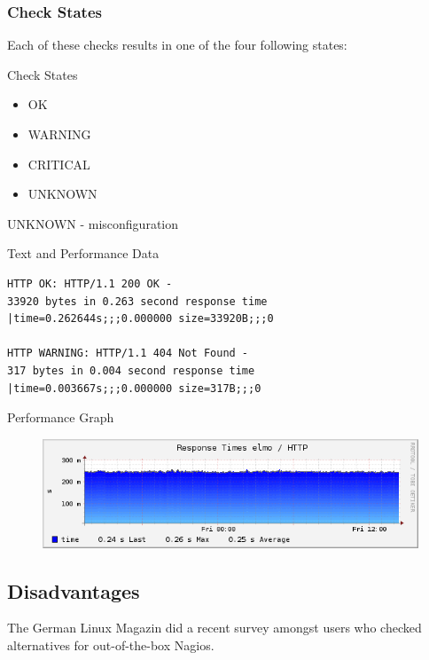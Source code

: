 \subsubsection{Check States}

Each of these checks results in one of the four
following states:

\begin{frame}[fragile]{Check States}

\begin{itemize}
\item OK
\item WARNING 
\item CRITICAL
\item UNKNOWN
\end{itemize}
\end{frame}

UNKNOWN - misconfiguration

\begin{frame}[fragile]{Text and Performance Data}
\begin{lstlisting}
HTTP OK: HTTP/1.1 200 OK -
33920 bytes in 0.263 second response time
|time=0.262644s;;;0.000000 size=33920B;;;0

HTTP WARNING: HTTP/1.1 404 Not Found - 
317 bytes in 0.004 second response time 
|time=0.003667s;;;0.000000 size=317B;;;0
\end{lstlisting}
\end{frame}

\begin{frame}{Performance Graph}
\begin{figure}
\includegraphics[width=\textwidth]{images/perfdata.png}
\end{figure}
\end{frame}

\subsection{Disadvantages}

The German Linux Magazin did a recent survey amongst users
who checked alternatives for out-of-the-box Nagios.

